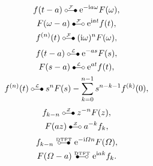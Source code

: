 \documentclass[DIV=13]{scrartcl}
\begin{document}
\begin{gather}
  f(t-a) \transform[F] \e^{-\i a\omega}F(\omega), \\
  F(\omega-a) \itransform[F] \e^{\i at}f(t), \\
  f^{(n)}(t) \transform[F] (\i\omega)^nF(\omega),
\end{gather}
\begin{gather}
  f(t-a) \transform[L] \e^{-as}F(s), \\
  F(s-a) \itransform[L] \e^{at}f(t), \\
  f^{(n)}(t) \transform[L] s^n F(s) - \sum_{k=0}^{n-1} s^{n-k-1} f^{(k)}(0),
\end{gather}
\begin{gather}
  f_{k-n} \transform[Z] z^{-n}F(z), \\
  F(az) \itransform[Z] a^{-k} f_k,
\end{gather}
\begin{gather}
  f_{k-n} \transform[\mathrm{DTFT}] \e^{-\i\varOmega n} F(\varOmega), \\
  F(\varOmega-a) \itransform[\mathrm{DTFT}] \e^{\i ak}f_k.
\end{gather}
\end{document}
